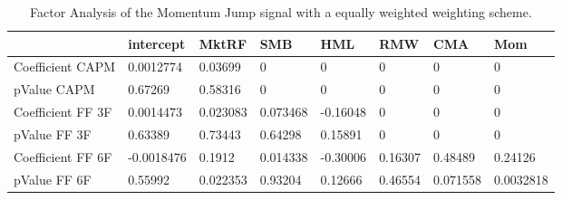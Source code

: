 \begin{table}[H]
\centering
\begin{tabular}{llllllll}
& intercept & MktRF & SMB & HML & RMW & CMA & Mom \\ 
\hline 
Coefficient CAPM & 0.0012774 & 0.03699 & 0 & 0 & 0 & 0 & 0 \\ 
pValue CAPM & 0.67269 & 0.58316 & 0 & 0 & 0 & 0 & 0 \\ 
Coefficient FF 3F & 0.0014473 & 0.023083 & 0.073468 & -0.16048 & 0 & 0 & 0 \\ 
pValue FF 3F & 0.63389 & 0.73443 & 0.64298 & 0.15891 & 0 & 0 & 0 \\ 
Coefficient FF 6F & -0.0018476 & 0.1912 & 0.014338 & -0.30006 & 0.16307 & 0.48489 & 0.24126 \\ 
pValue FF 6F & 0.55992 & 0.022353 & 0.93204 & 0.12666 & 0.46554 & 0.071558 & 0.0032818 \\ 
\hline
\end{tabular}
\caption{Factor Analysis of the Momentum Jump signal with a equally weighted weighting scheme.}
\label{MOMJUMPEW_FACTOR}
\end{table}